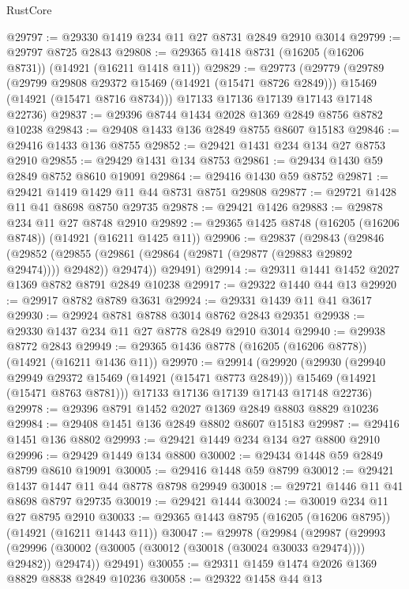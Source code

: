 \begin{lexlean}{RustCore}
\begin{coremodule}
@29797 := @29330 @1419 @234 @11 @27 @8731 @2849 @2910 @3014
@29799 := @29797 @8725 @2843
@29808 := @29365 @1418 @8731 (@16205 (@16206 @8731)) (@14921 (@16211 @1418 @11))
@29829 := @29773
    (@29779
      (@29789
        (@29799 @29808 @29372 @15469 (@14921 (@15471 @8726 @2849)))
        @15469
        (@14921 (@15471 @8716 @8734)))
      @17133
      @17136
      @17139
      @17143
      @17148
      @22736)
@29837 := @29396 @8744 @1434 @2028 @1369 @2849 @8756 @8782 @10238
@29843 := @29408 @1433 @136 @2849 @8755 @8607 @15183
@29846 := @29416 @1433 @136 @8755
@29852 := @29421 @1431 @234 @134 @27 @8753 @2910
@29855 := @29429 @1431 @134 @8753
@29861 := @29434 @1430 @59 @2849 @8752 @8610 @19091
@29864 := @29416 @1430 @59 @8752
@29871 := @29421 @1419 @1429 @11 @44 @8731 @8751 @29808
@29877 := @29721 @1428 @11 @41 @8698 @8750 @29735
@29878 := @29421 @1426
@29883 := @29878 @234 @11 @27 @8748 @2910
@29892 := @29365 @1425 @8748 (@16205 (@16206 @8748)) (@14921 (@16211 @1425 @11))
@29906 := @29837
    (@29843
      (@29846
        (@29852 (@29855 (@29861 (@29864 (@29871 (@29877 (@29883 @29892 @29474)))) @29482)) @29474))
      @29491)
@29914 := @29311 @1441 @1452 @2027 @1369 @8782 @8791 @2849 @10238
@29917 := @29322 @1440 @44 @13
@29920 := @29917 @8782 @8789 @3631
@29924 := @29331 @1439 @11 @41 @3617
@29930 := @29924 @8781 @8788 @3014 @8762 @2843 @29351
@29938 := @29330 @1437 @234 @11 @27 @8778 @2849 @2910 @3014
@29940 := @29938 @8772 @2843
@29949 := @29365 @1436 @8778 (@16205 (@16206 @8778)) (@14921 (@16211 @1436 @11))
@29970 := @29914
    (@29920
      (@29930
        (@29940 @29949 @29372 @15469 (@14921 (@15471 @8773 @2849)))
        @15469
        (@14921 (@15471 @8763 @8781)))
      @17133
      @17136
      @17139
      @17143
      @17148
      @22736)
@29978 := @29396 @8791 @1452 @2027 @1369 @2849 @8803 @8829 @10236
@29984 := @29408 @1451 @136 @2849 @8802 @8607 @15183
@29987 := @29416 @1451 @136 @8802
@29993 := @29421 @1449 @234 @134 @27 @8800 @2910
@29996 := @29429 @1449 @134 @8800
@30002 := @29434 @1448 @59 @2849 @8799 @8610 @19091
@30005 := @29416 @1448 @59 @8799
@30012 := @29421 @1437 @1447 @11 @44 @8778 @8798 @29949
@30018 := @29721 @1446 @11 @41 @8698 @8797 @29735
@30019 := @29421 @1444
@30024 := @30019 @234 @11 @27 @8795 @2910
@30033 := @29365 @1443 @8795 (@16205 (@16206 @8795)) (@14921 (@16211 @1443 @11))
@30047 := @29978
    (@29984
      (@29987
        (@29993 (@29996 (@30002 (@30005 (@30012 (@30018 (@30024 @30033 @29474)))) @29482)) @29474))
      @29491)
@30055 := @29311 @1459 @1474 @2026 @1369 @8829 @8838 @2849 @10236
@30058 := @29322 @1458 @44 @13

\end{coremodule}
\end{lexlean}
